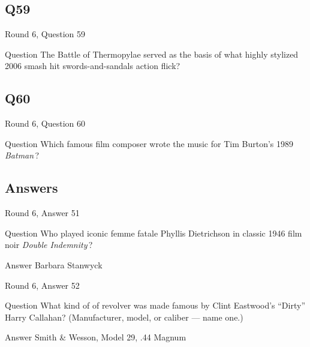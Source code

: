 \documentclass[11pt]{beamer}
\begin{document}
\subsection*{Q59}
\begin{frame}[t]{Round 6, Question 59}
\vspace{2em}
\begin{block}{Question}
The Battle of Thermopylae served as the basis of what highly stylized 2006 smash hit swords-and-sandals action flick?
\end{block}
\end{frame}
    

\subsection*{Q60}
\begin{frame}[t]{Round 6, Question 60}
\vspace{2em}
\begin{block}{Question}
Which famous film composer wrote the music for Tim Burton's 1989 \emph{Batman}\,?
\end{block}
\end{frame}
    
\subsection{Answers}

\begin{frame}[t]{Round 6, Answer 51}
\vspace{2em}
\begin{block}{Question}
Who played iconic femme fatale Phyllis Dietrichson in classic 1946 film noir \emph{Double Indemnity}\,?
\end{block}
\pause{}
\begin{block}{Answer}
Barbara Stanwyck
\end{block}
\end{frame}
    

\begin{frame}[t]{Round 6, Answer 52}
\vspace{2em}
\begin{block}{Question}
What kind of of revolver was made famous by Clint Eastwood's ``Dirty'' Harry Callahan? (Manufacturer, model, or caliber — name one.)
\end{block}
\pause{}
\begin{block}{Answer}
Smith \& Wesson, Model 29, .44 Magnum
\end{block}
\end{frame}
    
\end{document}
